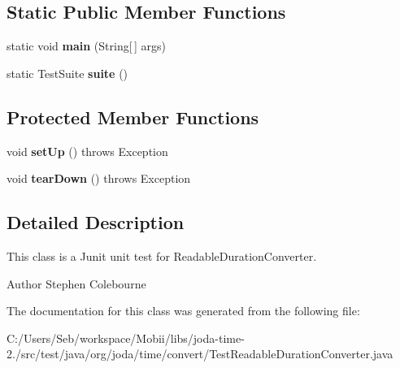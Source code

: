 \subsection*{Static Public Member Functions}
\begin{DoxyCompactItemize}
\item 
\hypertarget{classorg_1_1joda_1_1time_1_1convert_1_1_test_readable_duration_converter_a38aee7d6a1a683c64cdc760c6afec824}{static void {\bfseries main} (String\mbox{[}$\,$\mbox{]} args)}\label{classorg_1_1joda_1_1time_1_1convert_1_1_test_readable_duration_converter_a38aee7d6a1a683c64cdc760c6afec824}

\item 
\hypertarget{classorg_1_1joda_1_1time_1_1convert_1_1_test_readable_duration_converter_aef8aa184c7048b5070b3d48e570ad289}{static Test\-Suite {\bfseries suite} ()}\label{classorg_1_1joda_1_1time_1_1convert_1_1_test_readable_duration_converter_aef8aa184c7048b5070b3d48e570ad289}

\end{DoxyCompactItemize}
\subsection*{Protected Member Functions}
\begin{DoxyCompactItemize}
\item 
\hypertarget{classorg_1_1joda_1_1time_1_1convert_1_1_test_readable_duration_converter_ac121ae811bcb7e72b16fc364d22ff0cf}{void {\bfseries set\-Up} ()  throws Exception }\label{classorg_1_1joda_1_1time_1_1convert_1_1_test_readable_duration_converter_ac121ae811bcb7e72b16fc364d22ff0cf}

\item 
\hypertarget{classorg_1_1joda_1_1time_1_1convert_1_1_test_readable_duration_converter_a879dbd925b2ea1984cebff37d61c74e5}{void {\bfseries tear\-Down} ()  throws Exception }\label{classorg_1_1joda_1_1time_1_1convert_1_1_test_readable_duration_converter_a879dbd925b2ea1984cebff37d61c74e5}

\end{DoxyCompactItemize}


\subsection{Detailed Description}
This class is a Junit unit test for Readable\-Duration\-Converter.

\begin{DoxyAuthor}{Author}
Stephen Colebourne 
\end{DoxyAuthor}


The documentation for this class was generated from the following file\-:\begin{DoxyCompactItemize}
\item 
C\-:/\-Users/\-Seb/workspace/\-Mobii/libs/joda-\/time-\/2./src/test/java/org/joda/time/convert/Test\-Readable\-Duration\-Converter.\-java\end{DoxyCompactItemize}
